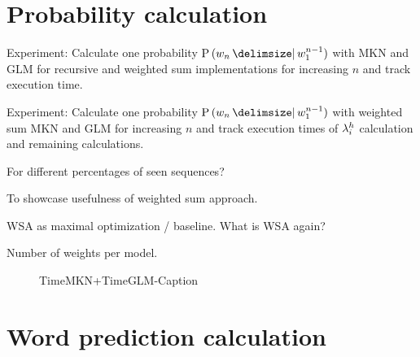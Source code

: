 \section{Probability calculation}
\label{sec:evaluation-probability}

\begin{draft}
Experiment: Calculate one probability $\Prob{w_n}{w_1^{n-1}}$ with MKN and GLM
for recursive and weighted sum implementations for increasing $n$ and track
execution time.

Experiment: Calculate one probability $\Prob{w_n}{w_1^{n-1}}$ with weighted sum
MKN and GLM for increasing $n$ and track execution times of $\lambda^h_i$
calculation and remaining calculations.

For different percentages of seen sequences?

To showcase usefulness of weighted sum approach.

WSA as maximal optimization / baseline.
What is WSA again?

Number of weights per model.
\end{draft}

\begin{figure}
  \hspace{-5em}
  \centering
  \begin{subfigure}{.45\textwidth}
    
  \end{subfigure}
  \hspace{4em}
  \begin{subfigure}{.45\textwidth}
    
  \end{subfigure}
  \caption{TimeMKN+TimeGLM-Caption}
\end{figure}

\section{Word prediction calculation}

